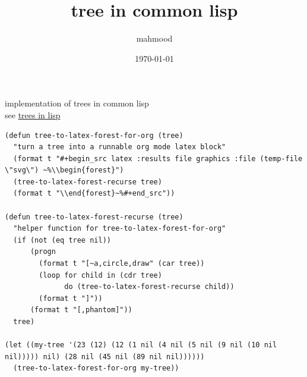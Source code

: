 \documentclass[a4paper,12pt]{article}
\author{mahmood}
\date{\today}
\title{tree in common lisp}
\begin{document}
\maketitle
implementation of trees in common lisp\\
see \href{20230226232630-trees_in_lisp.org}{trees in lisp}\\
\lstset{language=Lisp,label= ,caption= ,captionpos=b,numbers=none}
\begin{lstlisting}
(defun tree-to-latex-forest-for-org (tree)
  "turn a tree into a runnable org mode latex block"
  (format t "#+begin_src latex :results file graphics :file (temp-file \"svg\") ~%\\begin{forest}")
  (tree-to-latex-forest-recurse tree)
  (format t "\\end{forest}~%#+end_src"))

(defun tree-to-latex-forest-recurse (tree)
  "helper function for tree-to-latex-forest-for-org"
  (if (not (eq tree nil))
      (progn
        (format t "[~a,circle,draw" (car tree))
        (loop for child in (cdr tree)
              do (tree-to-latex-forest-recurse child))
        (format t "]"))
      (format t "[,phantom]"))
  tree)

(let ((my-tree '(23 (12) (12 (1 nil (4 nil (5 nil (9 nil (10 nil nil))))) nil) (28 nil (45 nil (89 nil nil))))))
  (tree-to-latex-forest-for-org my-tree))
\end{lstlisting}

\\
\end{document}
